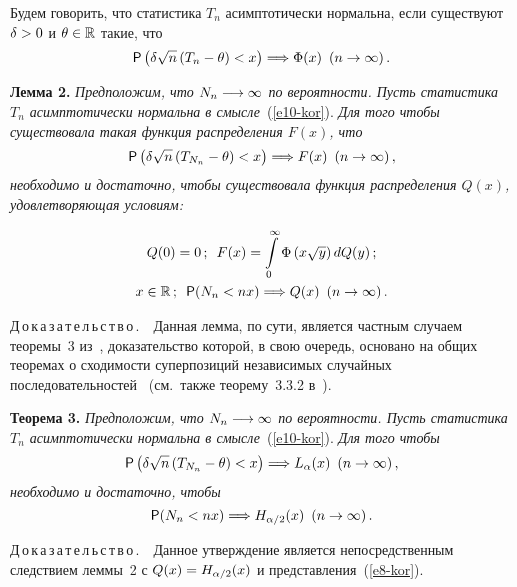 \begin{multicols}{2}
Будем говорить, что статистика $T_n$ асимптотически нормальна, если
существуют $\delta\hm>0$ и $\theta\hm\in\r$ такие, что
\begin{equation}
{\sf P}\left(\delta\sqrt{n}\left(T_n-\theta\right)<x\right)\Longrightarrow\Phi(x)
\enskip (n\to\infty)\,.\label{e10-kor}
\end{equation}

\smallskip

\noindent
\textbf{Лемма 2.} {\it Предположим, что $N_n\hm\longrightarrow\infty$ по
вероятности. Пусть статистика $T_n$ асимптотически нормальна в
смысле}~(\ref{e10-kor}). \textit{Для того чтобы существовала такая функция
распределения $F(x)$, что}
$$
{\sf P}\left(\delta\sqrt{n}\left(T_{N_n}-\theta\right)<x\right)
\Longrightarrow F(x)\enskip (n\to\infty)\,,
$$
\textit{необходимо и достаточно, чтобы существовала функция распределения
$Q(x)$, удовлетворяющая условиям:}

\vspace*{-2pt}

\noindent
\begin{gather*}
Q(0)=0\,;\enskip F(x)=\int\limits_{0}^{\infty}\Phi\left(x\sqrt{y}\right)dQ(y)\,;\\
x\in\mathbb{R}\,;\enskip {\sf P}(N_n<nx)\Longrightarrow Q(x) \enskip
(n\to\infty)\,.
\end{gather*}



\noindent
Д\,о\,к\,а\,з\,а\,т\,е\,л\,ь\,с\,т\,в\,о\,.\ \ Данная лемма, по сути, является
частным случаем теоремы~3 из~\cite{Korolev1995}, доказательство
которой, в свою очередь, основано на общих теоремах о сходимости
суперпозиций независимых случайных последовательностей~\cite{Korolev1994, Korolev1996} 
(см.\ также теорему~3.3.2 в~\cite{GnedenkoKorolev1996-k}).

\smallskip

\noindent
\textbf{Теорема 3.} {\it Предположим, что $N_n\hm\longrightarrow\infty$ по
вероятности. Пусть статистика $T_n$ асимптотически нормальна в
смысле}~(\ref{e10-kor}). \textit{Для того чтобы}
$$
{\sf P}\left(\delta\sqrt{n}\left(T_{N_n}-\theta\right)<x\right)
\Longrightarrow L_{\alpha}(x)\enskip (n\to\infty)\,,
$$
\textit{необходимо и достаточно, чтобы}
$$
{\sf P}(N_n<nx)\Longrightarrow H_{\alpha/2}(x)\enskip (n\to\infty)\,.
$$


\noindent
Д\,о\,к\,а\,з\,а\,т\,е\,л\,ь\,с\,т\,в\,о\,.\ \ Данное утверждение является
непосредственным следствием леммы~2 с $Q(x)\hm=H_{\alpha/2}(x)$ и
представления~(\ref{e8-kor}).


\end{multicols}

